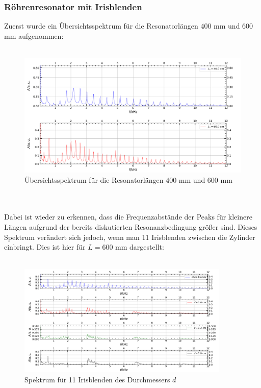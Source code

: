 \documentclass[german,  %
parskip=full,  %
]{scrartcl}
\begin{document}
\subsubsection{Röhrenresonator mit Irisblenden}
Zuerst wurde ein Übersichtsspektrum für die Resonatorlängen $400$ mm und $600$ mm aufgenommen:
\\\\
\begin{figure}[h!]
\centering
\includegraphics[width=\textwidth]{4611.png}
\caption{Übersichtsspektrum für die Resonatorlängen $400$ mm und $600$ mm}
\end{figure}
\\\\
Dabei ist wieder zu erkennen, dass die Frequenzabstände der Peaks für kleinere Längen aufgrund der bereits diskutierten Resonanzbedingung größer sind. 
\newline Dieses Spektrum verändert sich jedoch, wenn man 11 Irisblenden zwischen die Zylinder einbringt. Dies ist hier für $L=600$ mm dargestellt:
\\\\
\begin{figure}[h!]
\centering
\includegraphics[width=0.9\textwidth]{4612_und_4613.png}
\caption{Spektrum für 11 Irisblenden des Durchmessers $d$}
\end{figure}
\end{document}
